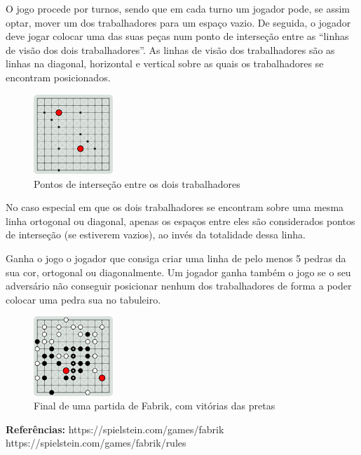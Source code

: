 \documentclass[a4paper]{article}
\begin{document}
O jogo procede por turnos, sendo que em cada turno um jogador pode, se assim optar, mover um dos trabalhadores para um espaço vazio. De seguida, o jogador deve jogar colocar uma das suas peças num ponto de interseção entre as “linhas de visão dos dois trabalhadores”. As linhas de visão dos trabalhadores são as linhas na diagonal, horizontal e vertical sobre as quais os trabalhadores se encontram posicionados.

\begin{figure}[h!]
\begin{center}
\includegraphics[height=3cm,width=3cm]{images/fabrik_intersection.png}
\caption{Pontos de interseção entre os dois trabalhadores}
\label{Figura 2}
\end{center}
\end{figure}

No caso especial em que os dois trabalhadores se encontram sobre uma mesma linha ortogonal ou diagonal, apenas os espaços entre eles são considerados pontos de interseção (se estiverem vazios), ao invés da totalidade dessa linha.

Ganha o jogo o jogador que consiga criar uma linha de pelo menos 5 pedras da sua cor, ortogonal ou diagonalmente. Um jogador ganha também o jogo se o seu adversário não conseguir posicionar nenhum dos trabalhadores de forma a poder colocar uma pedra sua no tabuleiro.

\begin{figure}[h!]
\begin{center}
\includegraphics[height=3cm,width=3cm]{images/fabrik_full_board.png}
\caption{Final de uma partida de Fabrik, com vitórias das pretas}
\label{Figura 3}
\end{center}
\end{figure}

\vfill
\textbf{Referências:}\newline
https://spielstein.com/games/fabrik\newline
https://spielstein.com/games/fabrik/rules
\end{document}
